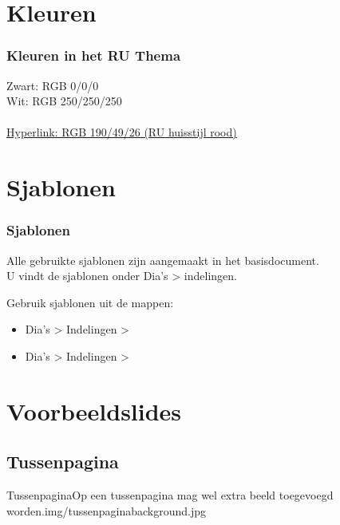 \documentclass[department=none, notes={show notes}, slidesperpage=4, official=true, handout]{beamerruhuisstijl}
\begin{document}
\section{Kleuren}
\begin{frame}
    \frametitle{Kleuren in het RU Thema}

    Zwart: RGB 0/0/0 \\
    Wit: RGB 250/250/250 \\
     \\
    \href{http://google.com/}{Hyperlink: RGB 190/49/26 (RU huisstijl rood)}
\end{frame}
\note{}

\section{Sjablonen}
\begin{frame}
    \frametitle{Sjablonen}
    
    \begin{block}{}
        Alle gebruikte sjablonen zijn aangemaakt in het basisdocument. \\
        U vindt de sjablonen onder Dia's > indelingen.
    \end{block}

    \begin{block}{}
        Gebruik sjablonen uit de mappen:
        \begin{itemize}
            \item Dia's > Indelingen > 
            \item Dia's > Indelingen > 
        \end{itemize}
    \end{block}


\end{frame}


\section{Voorbeeldslides}
\subsection{Tussenpagina}
\begin{tussenpagina}{Tussenpagina}{Op een tussenpagina mag wel extra beeld toegevoegd worden.}{img/tussenpaginabackground.jpg}
\end{tussenpagina}
\note{
}
\end{document}
